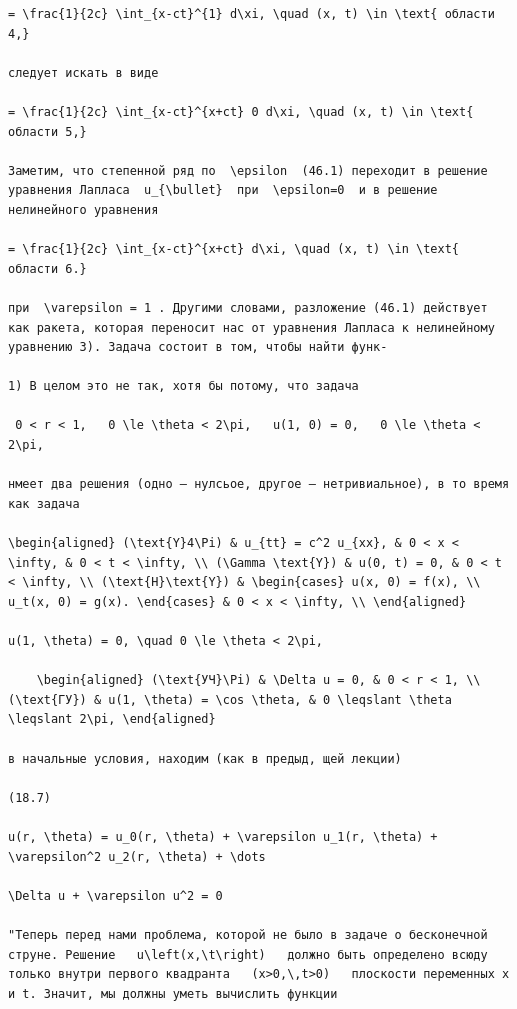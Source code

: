 \documentclass[
  ukrainian,
]{article}
\begin{document}
\begin{verbatim}
= \frac{1}{2c} \int_{x-ct}^{1} d\xi, \quad (x, t) \in \text{ области 4,}

следует искать в виде

= \frac{1}{2c} \int_{x-ct}^{x+ct} 0 d\xi, \quad (x, t) \in \text{ области 5,}

Заметим, что степенной ряд по  \epsilon  (46.1) переходит в решение уравнения Лапласа  u_{\bullet}  при  \epsilon=0  и в решение нелинейного уравнения

= \frac{1}{2c} \int_{x-ct}^{x+ct} d\xi, \quad (x, t) \in \text{ области 6.}

при  \varepsilon = 1 . Другими словами, разложение (46.1) действует как ракета, которая переносит нас от уравнения Лапласа к нелинейному уравнению 3). Задача состоит в том, чтобы найти функ-

1) В целом это не так, хотя бы потому, что задача

 0 < r < 1,   0 \le \theta < 2\pi,   u(1, 0) = 0,   0 \le \theta < 2\pi, 

нмеет два решения (одно — нулсьое, другое — нетривиальное), в то время как задача

\begin{aligned} (\text{Y}4\Pi) & u_{tt} = c^2 u_{xx}, & 0 < x < \infty, & 0 < t < \infty, \\ (\Gamma \text{Y}) & u(0, t) = 0, & 0 < t < \infty, \\ (\text{H}\text{Y}) & \begin{cases} u(x, 0) = f(x), \\ u_t(x, 0) = g(x). \end{cases} & 0 < x < \infty, \\ \end{aligned}

u(1, \theta) = 0, \quad 0 \le \theta < 2\pi,

    \begin{aligned} (\text{УЧ}\Pi) & \Delta u = 0, & 0 < r < 1, \\ (\text{ГУ}) & u(1, \theta) = \cos \theta, & 0 \leqslant \theta \leqslant 2\pi, \end{aligned}

в начальные условия, находим (как в предыд, щей лекции)

(18.7)

u(r, \theta) = u_0(r, \theta) + \varepsilon u_1(r, \theta) + \varepsilon^2 u_2(r, \theta) + \dots

\Delta u + \varepsilon u^2 = 0

"Теперь перед нами проблема, которой не было в задаче о бесконечной струне. Решение   u\left(x,\t\right)   должно быть определено всюду только внутри первого квадранта   (x>0,\,t>0)   плоскости переменных x и t. Значит, мы должны уметь вычислить функции


\end{verbatim}
\end{document}
